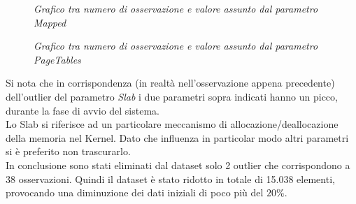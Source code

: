 \begin{figure}[H]
	\centering   
	\caption{\textit{Grafico tra numero di osservazione e valore assunto dal parametro Mapped}}
	\caption{\textit{Grafico tra numero di osservazione e valore assunto dal parametro PageTables}}
\end{figure}
Si nota che in corrispondenza (in realtà nell'osservazione appena precedente) dell'outlier del parametro \textit{Slab} i due parametri sopra indicati hanno un picco, durante la fase di avvio del sistema.
\\Lo Slab si riferisce ad un particolare meccanismo di allocazione/deallocazione della memoria nel Kernel. Dato che influenza in particolar modo altri parametri si è preferito non trascurarlo.\\
In conclusione sono stati eliminati dal dataset solo 2 outlier che corrispondono a 38 osservazioni. Quindi il dataset è stato ridotto in totale di 15.038 elementi, provocando una diminuzione dei dati iniziali di poco più del $20\%$.
\newpage

